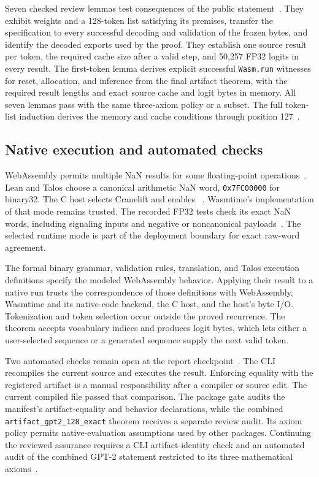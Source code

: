\documentclass[11pt]{article}
\newcommand{\code}[1]{\texttt{#1}}
\newcommand{\longcode}[1]{\texttt{\seqsplit{#1}}}
\begin{document}
Seven checked review lemmas test consequences of the public statement~\cite{reviewlemmas}.  They exhibit weights and a 128-token list satisfying its premises, transfer the specification to every successful decoding and validation of the frozen bytes, and identify the decoded exports used by the proof.  They establish one source result per token, the required cache size after a valid step, and 50,257 FP32 logits in every result.  The first-token lemma derives explicit successful \code{Wasm.run} witnesses for reset, allocation, and inference from the final artifact theorem, with the required result lengths and exact source cache and logit bytes in memory.  All seven lemmas pass with the same three-axiom policy or a subset.  The full token-list induction derives the memory and cache conditions through position 127~\cite{session,reviewlemmas}.

\subsection{Native execution and automated checks}

WebAssembly permits multiple NaN results for some floating-point operations~\cite{wasmspec}.  Lean and Talos choose a canonical arithmetic NaN word, \code{0x7FC00000} for binary32.  The C host selects Cranelift and enables \longcode{wasmtime\_config\_cranelift\_nan\_canonicalization\_set}~\cite{wasmtime,driver}.  Wasmtime's implementation of that mode remains trusted.  The recorded FP32 tests check its exact NaN words, including signaling inputs and negative or noncanonical payloads~\cite{tests}.  The selected runtime mode is part of the deployment boundary for exact raw-word agreement.

The formal binary grammar, validation rules, translation, and Talos execution definitions specify the modeled WebAssembly behavior.  Applying their result to a native run trusts the correspondence of those definitions with WebAssembly, Wasmtime and its native-code backend, the C host, and the host's byte I/O.  Tokenization and token selection occur outside the proved recurrence.  The theorem accepts vocabulary indices and produces logit bytes, which lets either a user-selected sequence or a generated sequence supply the next valid token.

Two automated checks remain open at the report checkpoint~\cite{review}.  The CLI recompiles the current source and executes the result.  Enforcing equality with the registered artifact is a manual responsibility after a compiler or source edit.  The current compiled file passed that comparison.  The package gate audits the manifest's artifact-equality and behavior declarations, while the combined \code{artifact\_gpt2\_128\_exact} theorem receives a separate review audit.  Its axiom policy permits native-evaluation assumptions used by other packages.  Continuing the reviewed assurance requires a CLI artifact-identity check and an automated audit of the combined GPT-2 statement restricted to its three mathematical axioms~\cite{driver,artifactgate}.
\end{document}
